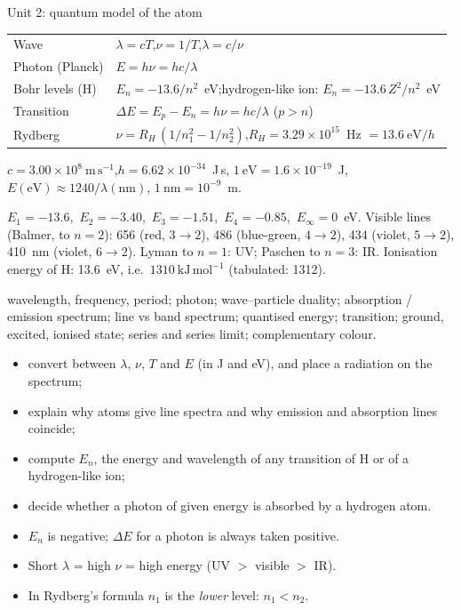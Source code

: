 \clearpage
\begin{recap}{Unit 2: quantum model of the atom}
\renewcommand{\arraystretch}{1.5}
\begin{tabular}{@{}l l@{}}
Wave & $\lambda = cT$,\quad $\nu = 1/T$,\quad $\lambda = c/\nu$\\
Photon (Planck) & $E = h\nu = hc/\lambda$\\
Bohr levels (H) & $E_n = -13.6/n^2$~eV;\quad hydrogen-like ion: $E_n = -13.6\,Z^2/n^2$~eV\\
Transition & $\Delta E = E_p - E_n = h\nu = hc/\lambda$ \quad($p > n$)\\
Rydberg & $\nu = R_H\,(1/n_1^2 - 1/n_2^2)$,\quad $R_H = 3.29\times10^{15}$~Hz $= 13.6\ \mathrm{eV}/h$
\end{tabular}

$c = 3.00\times10^8\ \mathrm{m\,s^{-1}}$,\quad $h = 6.62\times10^{-34}$~J\,s,\quad
$1\ \mathrm{eV} = 1.6\times10^{-19}$~J,\quad $E(\mathrm{eV})\approx1240/\lambda(\mathrm{nm})$,\quad
$1\ \mathrm{nm} = 10^{-9}$~m.

$E_1 = -13.6$,\ $E_2 = -3.40$,\ $E_3 = -1.51$,\ $E_4 = -0.85$,\ $E_\infty = 0$~eV.
Visible lines (Balmer, to $n = 2$): 656 (red, $3\to2$), 486 (blue-green, $4\to2$), 434 (violet,
$5\to2$), 410~nm (violet, $6\to2$). Lyman to $n = 1$: UV; Paschen to $n = 3$: IR.
Ionisation energy of H: 13.6~eV, i.e.\ $1310\ \mathrm{kJ\,mol^{-1}}$ (tabulated: 1312).

wavelength, frequency, period; photon; wave--particle duality; absorption / emission spectrum;
line vs band spectrum; quantised energy; transition; ground, excited, ionised state; series and series
limit; complementary colour.

\begin{itemize}
  \item convert between $\lambda$, $\nu$, $T$ and $E$ (in J and eV), and place a radiation on the spectrum;
  \item explain why atoms give line spectra and why emission and absorption lines coincide;
  \item compute $E_n$, the energy and wavelength of any transition of H or of a hydrogen-like ion;
  \item decide whether a photon of given energy is absorbed by a hydrogen atom.
\end{itemize}

\begin{itemize}
  \item $E_n$ is negative; $\Delta E$ for a photon is always taken positive.
  \item Short $\lambda$ = high $\nu$ = high energy (UV $>$ visible $>$ IR).
  \item In Rydberg's formula $n_1$ is the \emph{lower} level: $n_1 < n_2$.
\end{itemize}
\end{recap}
